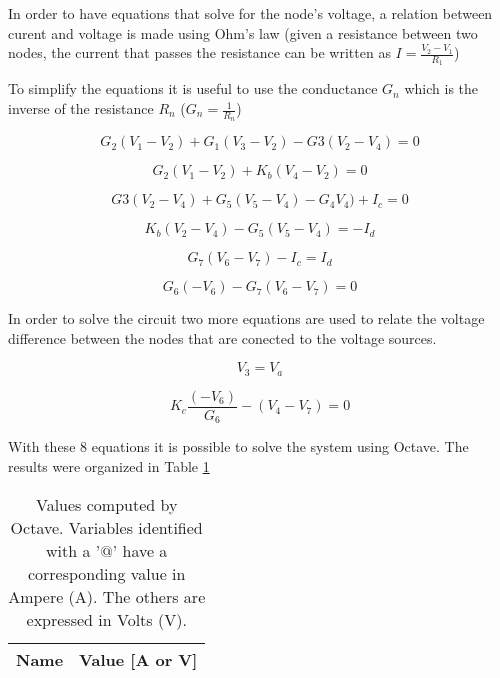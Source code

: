 In order to have equations that solve for the node’s voltage, a relation between curent and voltage is made using 
Ohm’s law (given a resistance between two nodes, the current that passes the resistance can be written as 
$I=\frac{V_2-V_1}{R_1}$)

To simplify the equations it is useful to use the conductance $G_n$ which is the inverse of the resistance $R_n$ 
($G_n=\frac{1}{R_n}$)

\begin{equation}
	G_2(V_1-V_2)+G_1(V_3-V_2) - G3(V_2-V_4) = 0
	\label{}
\end{equation}

\begin{equation}
	G_2(V_1-V_2)+K_b(V_4-V_2) = 0
	\label{}
\end{equation}

\begin{equation}
	G3(V_2-V_4)+G_5(V_5-V_4)-G_4V_4)+I_c=0
	\label{}
\end{equation} 

\begin{equation}
	K_b(V_2-V_4)-G_5(V_5-V_4)=-I_d
	\label{}
\end{equation}

\begin{equation}
	G_7(V_6-V_7)-I_c=I_d
	\label{}
\end{equation}

\begin{equation}
	G_6(-V_6)-G_7(V_6-V_7)=0
	\label{}
\end{equation}

In order to solve the circuit two more equations are used to relate the voltage difference between the nodes that 
are conected to the voltage sources.

\begin{equation}
	V_3 = V_a
	\label{}
\end{equation}

\begin{equation}
	K_c\frac{(-V_6)}{G_6}-(V_4-V_7)=0
	\label{}
\end{equation}


With these 8 equations it is possible to solve the system using Octave.
The results were organized in Table \ref{tab:node}

\begin{table}[h]
	\centering
	\begin{tabular}{|l|r|}
    		\hline    
    		{\bf Name} & {\bf Value [A or V]} \\ \hline
    		
  	\end{tabular}
  	\caption{Values computed by Octave. Variables identified with a '$@$' have a
  	corresponding value in Ampere (A). The others are expressed in Volts (V).}
 
\label{tab:node}
\end{table}


